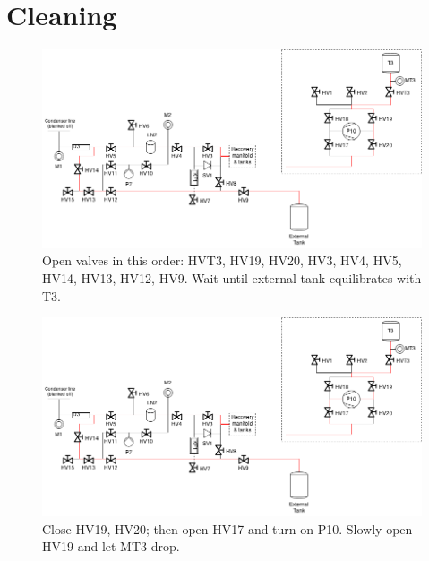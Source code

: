 \documentclass[a4paper,10pt]{article}
\begin{document}
\section{Cleaning}

\begin{figure}[htbp!]
 \centering
 \includegraphics[width=\textwidth]{./mash-cleaning-schematic-2-gas-to-ext-tank.png}
 \caption{Open valves in this order: HVT3, HV19, HV20, HV3, HV4, HV5, HV14, HV13, HV12, HV9.  Wait until external tank equilibrates with T3.}
 \label{b}
\end{figure}

\begin{figure}[htbp!]
 \centering
 \includegraphics[width=\textwidth]{./mash-cleaning-schematic-3-pump-gas-to-ext-tank.png}
 \caption{Close HV19, HV20; then open HV17 and turn on P10.  Slowly open HV19 and let MT3 drop.}
 \label{c}
\end{figure}
\end{document}
